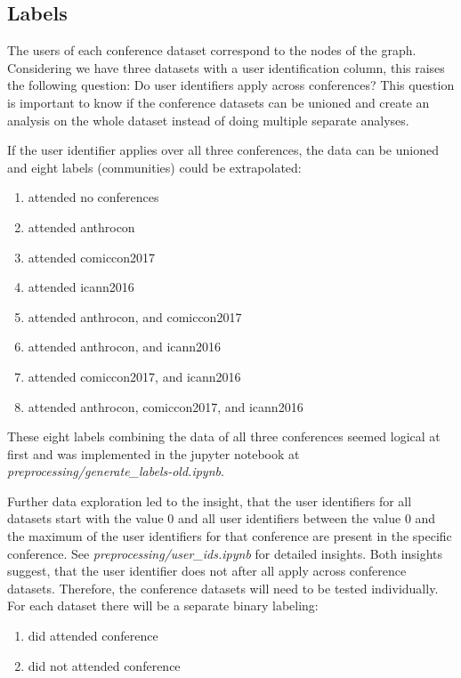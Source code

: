 \documentclass[sigconf]{acmart}
\begin{document}
\subsection{Labels}

The users of each conference dataset correspond to the nodes of the graph. Considering we have three datasets with a user identification column, this raises the following question: Do user identifiers apply across conferences? This question is important to know if the conference datasets can be unioned and create an analysis on the whole dataset instead of doing multiple separate analyses.

If the user identifier applies over all three conferences, the data can be unioned and eight labels (communities) could be extrapolated:

\begin{enumerate}
	\item attended no conferences
	\item attended anthrocon
	\item attended comiccon2017
	\item attended icann2016
	\item attended anthrocon, and comiccon2017
	\item attended anthrocon, and icann2016
	\item attended comiccon2017, and icann2016
	\item attended anthrocon, comiccon2017, and icann2016
\end{enumerate}

These eight labels combining the data of all three conferences seemed logical at first and was implemented in the jupyter notebook at \textit{preprocessing/generate\_labels-old.ipynb}.

Further data exploration led to the insight, that the user identifiers for all datasets start with the value $0$ and all user identifiers between the value $0$ and the maximum of the user identifiers for that conference are present in the specific conference. See \textit{preprocessing/user\_ids.ipynb} for detailed insights. Both insights suggest, that the user identifier does not after all apply across conference datasets. Therefore, the conference datasets will need to be tested individually. For each dataset there will be a separate binary labeling:

\begin{enumerate}
	\item did attended conference
	\item did not attended conference
\end{enumerate}
\end{document}
